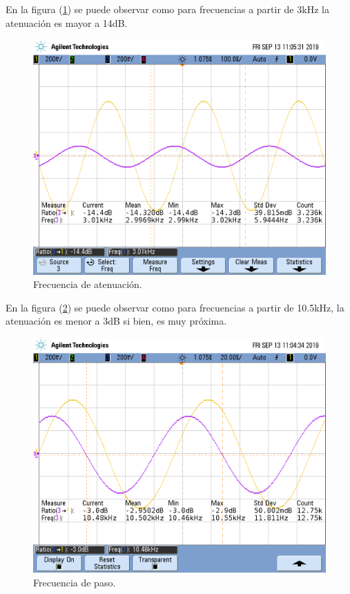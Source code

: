 \documentclass[a4paper]{article}
\begin{document}
En la figura (\ref{fig:fahp}) se puede observar como para frecuencias a partir de 3kHz la atenuación es mayor a 14dB.
\begin{figure}[H]	
	\centering
	\includegraphics[width=\textwidth]{ImagenesEj2/MedicionesGrilla/fa_hp.png}
	\caption{Frecuencia de atenuación.}
	\label{fig:fahp}
\end{figure}

En la figura (\ref{fig:fphp}) se puede observar como para frecuencias a partir de 10.5kHz, la atenuación es menor a 3dB si bien, es muy próxima.

\begin{figure}[H]	
	\centering
	\includegraphics[width=\textwidth]{ImagenesEj2/MedicionesGrilla/fp_hp.png}
	\caption{Frecuencia de paso.}
	\label{fig:fphp}
\end{figure}
\end{document}
